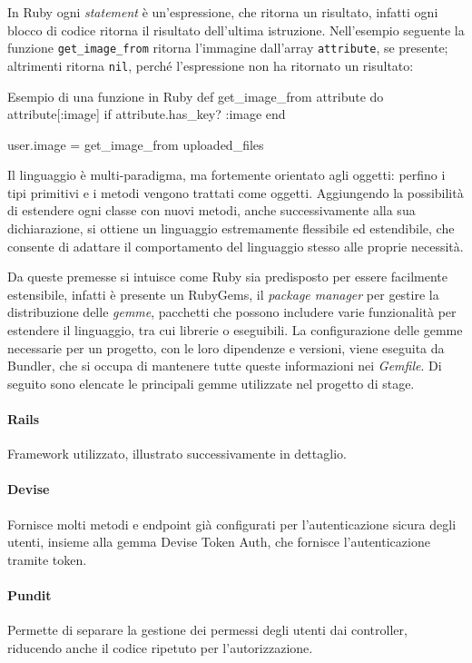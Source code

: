 \noindent In Ruby ogni \emph{statement} è un'espressione, che ritorna un risultato, infatti ogni blocco di codice ritorna il risultato dell'ultima istruzione. Nell'esempio seguente la funzione \verb|get_image_from| ritorna l'immagine dall'array \verb|attribute|, se presente; altrimenti ritorna \verb|nil|, perché l'espressione non ha ritornato un risultato:
\begin{code}{Esempio di una funzione in Ruby}
	def get_image_from attribute do
		attribute[:image] if attribute.has_key? :image
	end

	user.image = get_image_from uploaded_files
\end{code}

\noindent Il linguaggio è multi-paradigma, ma fortemente orientato agli oggetti: perfino i tipi primitivi e i metodi vengono trattati come oggetti. Aggiungendo la possibilità di estendere ogni classe con nuovi metodi, anche successivamente alla sua dichiarazione, si ottiene un linguaggio estremamente flessibile ed estendibile, che consente di adattare il comportamento del linguaggio stesso alle proprie necessità.

Da queste premesse si intuisce come Ruby sia predisposto per essere facilmente estensibile, infatti è presente un RubyGems, il \emph{package manager} per gestire la distribuzione delle \emph{gemme}, pacchetti che possono includere varie funzionalità per estendere il linguaggio, tra cui librerie o eseguibili. La configurazione delle gemme necessarie per un progetto, con le loro dipendenze e versioni, viene eseguita da Bundler, che si occupa di mantenere tutte queste informazioni nei \emph{Gemfile}. Di seguito sono elencate le principali gemme utilizzate nel progetto di stage.
\paragraph{Rails} Framework utilizzato, illustrato successivamente in dettaglio.
\paragraph{Devise} Fornisce molti metodi e endpoint già configurati per l'autenticazione sicura degli utenti, insieme alla gemma Devise Token Auth, che fornisce l'autenticazione tramite token.
\paragraph{Pundit} Permette di separare la gestione dei permessi degli utenti dai controller, riducendo anche il codice ripetuto per l'autorizzazione.

